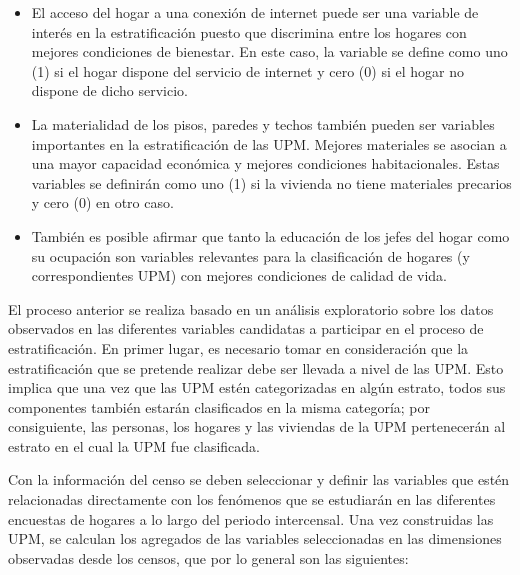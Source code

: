 \documentclass[
  12pt,
]{book}
\providecommand{\tightlist}{%
  \setlength{\itemsep}{0pt}\setlength{\parskip}{0pt}}
\begin{document}
\begin{itemize}
\tightlist
\item
  El acceso del hogar a una conexión de internet puede ser una variable de interés en la estratificación puesto que discrimina entre los hogares con mejores condiciones de bienestar. En este caso, la variable se define como uno (1) si el hogar dispone del servicio de internet y cero (0) si el hogar no dispone de dicho servicio.
\item
  La materialidad de los pisos, paredes y techos también pueden ser variables importantes en la estratificación de las UPM. Mejores materiales se asocian a una mayor capacidad económica y mejores condiciones habitacionales. Estas variables se definirán como uno (1) si la vivienda no tiene materiales precarios y cero (0) en otro caso.
\item
  También es posible afirmar que tanto la educación de los jefes del hogar como su ocupación son variables relevantes para la clasificación de hogares (y correspondientes UPM) con mejores condiciones de calidad de vida.
\end{itemize}

El proceso anterior se realiza basado en un análisis exploratorio sobre los datos observados en las diferentes variables candidatas a participar en el proceso de estratificación. En primer lugar, es necesario tomar en consideración que la estratificación que se pretende realizar debe ser llevada a nivel de las UPM. Esto implica que una vez que las UPM estén categorizadas en algún estrato, todos sus componentes también estarán clasificados en la misma categoría; por consiguiente, las personas, los hogares y las viviendas de la UPM pertenecerán al estrato en el cual la UPM fue clasificada.

Con la información del censo se deben seleccionar y definir las variables que estén relacionadas directamente con los fenómenos que se estudiarán en las diferentes encuestas de hogares a lo largo del periodo intercensal. Una vez construidas las UPM, se calculan los agregados de las variables seleccionadas en las dimensiones observadas desde los censos, que por lo general son las siguientes:
\end{document}
